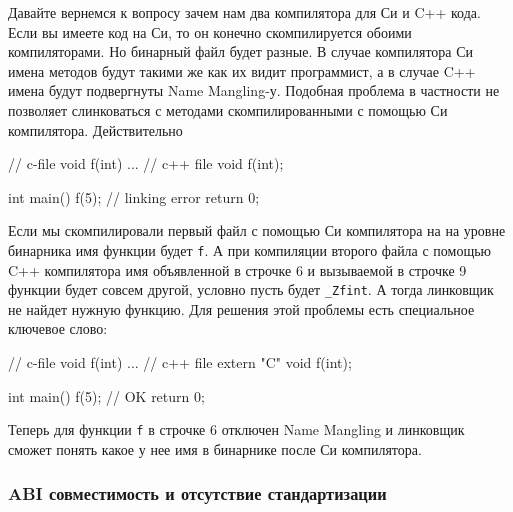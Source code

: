 Давайте вернемся к вопросу зачем нам два компилятора для Си и C++ кода.
Если вы имеете код на Си, то он конечно скомпилируется обоими компиляторами.
Но бинарный файл будет разные.
В случае компилятора Си имена методов будут такими же как их видит программист, а в случае C++ имена будут подвергнуты Name Mangling-у.
Подобная проблема в частности не позволяет слинковаться с методами скомпилированными с помощью Си компилятора.
Действительно
\begin{cppcode}
// c-file 
void f(int) {
...
}
// c++ file
void f(int);

int main() {
  f(5); // linking error
  return 0;
}
\end{cppcode}
Если мы скомпилировали первый файл с помощью Си компилятора на на уровне бинарника имя функции будет \verb"f".
А при компиляции второго файла с помощью C++ компилятора имя объявленной в строчке 6 и вызываемой в строчке 9 функции будет совсем другой, условно пусть будет \verb"_Zfint".
А тогда линковщик не найдет нужную функцию.
Для решения этой проблемы есть специальное ключевое слово: %
\begin{cppcode}
// c-file 
void f(int) {
...
}
// c++ file
extern "C" void f(int);

int main() {
  f(5); // OK
  return 0;
}
\end{cppcode}
Теперь для функции \verb"f" в строчке 6 отключен Name Mangling и линковщик сможет понять какое у нее имя в бинарнике после Си компилятора.

\subsubsection{ABI совместимость и отсутствие стандартизации}

